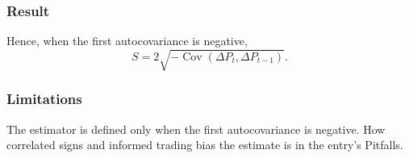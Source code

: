 \subsubsection{Result}
Hence, when the first autocovariance is negative,
\[ S=2\sqrt{-\operatorname{Cov}(\Delta P_t,\Delta P_{t-1})}. \]

\subsubsection{Limitations}
The estimator is defined only when the first autocovariance is negative. How correlated signs and informed trading bias the estimate is in the entry's Pitfalls.
